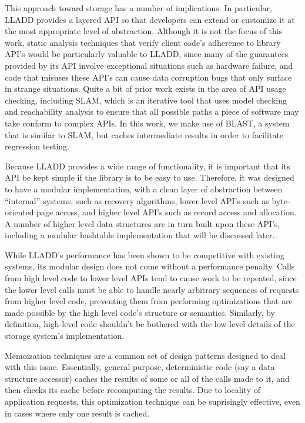 \documentclass[10pt,letterpaper,twocolumn,english]{article}
\newcommand{\yad}{LLADD\xspace}
\begin{document}
This approach toward storage has a number of implications.  In
particular, \yad provides a layered API so that developers can extend
or customize it at the most appropriate level of abstraction.
Although it is not the focus of this work, static analysis techniques
that verify client code's adherence to library API's would be
particularly valuable to \yad, since many of the guarantees provided
by its API involve exceptional situations such as hardware failure,
and code that misuses these API's can cause data corruption bugs that
only surface in strange situations.  Quite a bit of prior work exists
in the area of API usage checking, including SLAM, which is an
iterative tool that uses model checking and reachability analysis to
ensure that all possible paths a piece of software may take conform to
complex APIs.  In this work, we make use of BLAST, a system that is
similar to SLAM, but caches intermediate results in order to
facilitate regression testing.

Because \yad provides a wide range of functionality, it is important
that its API be kept simple if the library is to be easy to use.
Therefore, it was designed to have a modular implementation, with a
clean layer of abstraction between ``internal'' systems, such as
recovery algorithms, lower level API's such as byte-oriented page
access, and higher level API's such as record access and allocation.
A number of higher level data structures are in turn built upon these
API's, including a modular hashtable implementation that will be
discussed later.
 
While \yad's performance has been shown to be competitive with
existing systems, its modular design does not come without a
performance penalty.  Calls from high level code to lower level APIs
tend to cause work to be repeated, since the lower level calls must
be able to handle nearly arbitrary sequences of requests from higher
level code, preventing them from performing optimizations that are
made possible by the high level code's structure or semantics.
Similarly, by definition, high-level code shouldn't be bothered with
the low-level details of the storage system's implementation.  

Memoization techniques are a common set of design patterns designed to
deal with this issue.  Essentially, general purpose, deterministic
code (say a data structure accessor) caches the results of some or all
of the calls made to it, and then checks its cache before recomputing
the results.  Due to locality of application requests, this
optimization technique can be suprisingly effective, even in cases
where only one result is cached.
\end{document}
